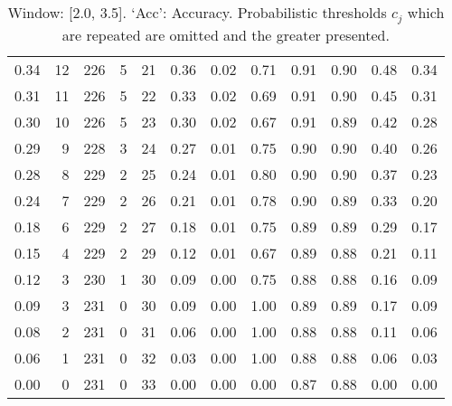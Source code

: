 \begin{table}[ht]
\begin{tabular}{r|rrrrrrrrrrr}
  0.34 & 12 & 226 & 5 & 21 & 0.36 & 0.02 & 0.71 & 0.91 & 0.90 & 0.48 & 0.34 \\ 
  0.31 & 11 & 226 & 5 & 22 & 0.33 & 0.02 & 0.69 & 0.91 & 0.90 & 0.45 & 0.31 \\ 
  0.30 & 10 & 226 & 5 & 23 & 0.30 & 0.02 & 0.67 & 0.91 & 0.89 & 0.42 & 0.28 \\ 
  0.29 & 9 & 228 & 3 & 24 & 0.27 & 0.01 & 0.75 & 0.90 & 0.90 & 0.40 & 0.26 \\ 
  0.28 & 8 & 229 & 2 & 25 & 0.24 & 0.01 & 0.80 & 0.90 & 0.90 & 0.37 & 0.23 \\ 
  0.24 & 7 & 229 & 2 & 26 & 0.21 & 0.01 & 0.78 & 0.90 & 0.89 & 0.33 & 0.20 \\ 
  0.18 & 6 & 229 & 2 & 27 & 0.18 & 0.01 & 0.75 & 0.89 & 0.89 & 0.29 & 0.17 \\ 
  0.15 & 4 & 229 & 2 & 29 & 0.12 & 0.01 & 0.67 & 0.89 & 0.88 & 0.21 & 0.11 \\ 
  0.12 & 3 & 230 & 1 & 30 & 0.09 & 0.00 & 0.75 & 0.88 & 0.88 & 0.16 & 0.09 \\ 
  0.09 & 3 & 231 & 0 & 30 & 0.09 & 0.00 & 1.00 & 0.89 & 0.89 & 0.17 & 0.09 \\ 
  0.08 & 2 & 231 & 0 & 31 & 0.06 & 0.00 & 1.00 & 0.88 & 0.88 & 0.11 & 0.06 \\ 
  0.06 & 1 & 231 & 0 & 32 & 0.03 & 0.00 & 1.00 & 0.88 & 0.88 & 0.06 & 0.03 \\ 
  0.00 & 0 & 231 & 0 & 33 & 0.00 & 0.00 & 0.00 & 0.87 & 0.88 & 0.00 & 0.00 \\  
   \hline
\end{tabular}
\endgroup
\caption{Window: [2.0, 3.5]. `Acc': Accuracy. Probabilistic thresholds $c_j$ which are repeated are omitted and the greater presented.} 
\label{tab:appendix-PBC-ROCs-w1}
\end{table}

